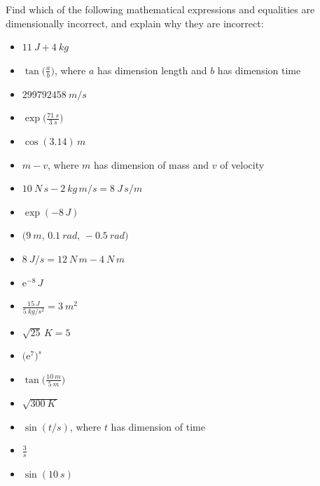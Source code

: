 \documentclass[a4paper,12pt,%
onecolumn,oneside,%
british%
]{memoir}
\newcommand*{\e}{\ensuremath{\mathrm{e}}}
\renewcommand*{\|}[1][]{\nonscript\:#1\vert\nonscript\:\mathopen{}}
\newcommand{\textdim}{\textsf}
\begin{document}
Find which of the following mathematical expressions and equalities are dimensionally incorrect, and explain why they are incorrect:
\begin{itemize}[label=\textbullet\enskip,itemsep=1ex]
\item $\displaystyle\qty{11}{J} + \qty{4}{kg}$%
\item $\displaystyle\tan\biggl(\frac{a}{b}\biggr)$, where $a$ has dimension \textdim{length} and $b$ has dimension \textdim{time}%
\item $\displaystyle\qty{299792458}{m/s}$
\item $\displaystyle\exp\biggl(\frac{\qty{71}{s}}{\qty{3}{s}}\biggr)$
\item $\displaystyle\cos(\num{3.14})\,\unit{m}$
\item $\displaystyle m - v$, where $m$ has dimension of \textdim{mass} and $v$ of \textdim{velocity}%
\item $\displaystyle \qty{10}{N\, s}-\qty{2}{kg\, m/s} = \qty{8}{J\, s/m}$
\item $\displaystyle\exp(-8\,\unit{J})$%
\item $\displaystyle\bigl(\qty{9}{m},\, \qty{0.1}{rad},\, -\qty{0.5}{rad}\bigr)$
\item $\displaystyle\qty{8}{J/s}=\qty{12}{N\,m}-\qty{4}{N\,m}$%
\item $\displaystyle\e^{-8}\,\unit{J}$
\item $\displaystyle\frac{\qty{15}{J}}{\qty{5}{kg/s^{2}}} = \qty{3}{m^{2}}$
\item $\displaystyle \sqrt{25}\,\unit{K} = 5$%
\item $\displaystyle\bigl(\e^{7}\bigr)^{\unit{s}}$%
\item $\displaystyle\tan\biggl(\frac{\qty{10}{m}}{\qty{5}{m}}\biggr)$
\item $\displaystyle\sqrt{\qty{300}{K}\,}$
\item $\displaystyle\sin(t/\unit{s})$, where $t$ has dimension of \textdim{time}
\item $\displaystyle\frac{3}{\unit{s}}$
\item $\displaystyle\sin(\qty{10}{s})$%
\end{itemize}
\end{document}
